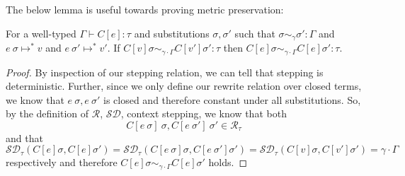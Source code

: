 The below lemma is useful towards proving metric preservation:
\begin{lemma}
  \label{thm:ctx-stepping}
  For a well-typed $\Gamma \vdash C[e] : \tau$ and substitutions $\sigma,
  \sigma'$ such that $\sigma \sim_{\gamma} \sigma' : \Gamma$ and
  $e~\sigma \mapsto^{*} v$ and
  $e~\sigma' \mapsto^{*} v'$.
  If $C[v] \sigma \sim_{\gamma \cdot \Gamma} C[v'] \sigma' : \tau$ then
  $C[e] \sigma \sim_{\gamma \cdot \Gamma} C [e] \sigma' : \tau$.
\end{lemma}
\begin{proof}
  By inspection of our stepping relation, we can tell that stepping is
  deterministic. Further, since we only define our rewrite relation over closed
  terms, we know that $e~\sigma, e~\sigma'$ is closed and therefore constant
  under all substitutions. 
  So, by the definition of $\mathcal{R}$, $\mathcal{SD}$, 
  context stepping, we know that both 
  $$
  C[e~\sigma]~\sigma, C[e~\sigma']~\sigma' \in \mathcal{R}_{\tau}
  $$ 
  and that 
  $$
  \mathcal{SD}_{\tau}(C[e]\sigma, C[e]\sigma') = 
  \mathcal{SD}_{\tau}(C[e~\sigma]\sigma, C[e~\sigma']\sigma') = 
  \mathcal{SD}_{\tau}(C[v]\sigma, C[v']\sigma') = 
  \gamma \cdot \Gamma
  $$
  respectively and therefore 
  $C[e] \sigma \sim_{\gamma \cdot \Gamma} C[e] \sigma'$
  holds.
\end{proof}

